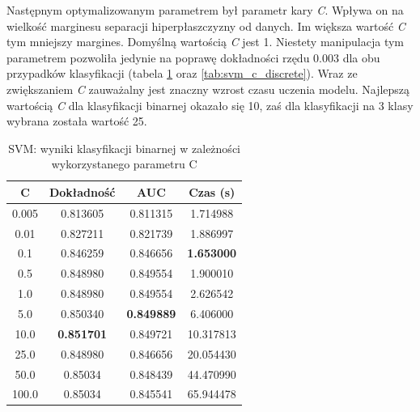 \documentclass[a4paper, twoside, 11pt, openright]{article}
\begin{document}
Następnym optymalizowanym parametrem był parametr kary \textit{C}. Wpływa on na wielkość marginesu separacji hiperpłaszczyzny od danych. Im większa wartość \textit{C} tym mniejszy margines. Domyślną wartością \textit{C} jest 1. Niestety manipulacja tym parametrem pozwoliła jedynie na poprawę dokładności rzędu $0.003$ dla obu przypadków klasyfikacji (tabela \ref{tab:svm_c_binary} oraz \ref{tab:svm_c_discrete}). Wraz ze zwiększaniem \textit{C} zauważalny jest znaczny wzrost czasu uczenia modelu. Najlepszą wartością \textit{C} dla klasyfikacji binarnej okazało się 10, zaś dla klasyfikacji na 3 klasy wybrana została wartość 25. 


\begin{table}[H]
    \centering
    \begin{tabular}{|c|c|c|c|}
    \hline
        \textbf{C} & \textbf{Dokładność} & \textbf{AUC} & \textbf{Czas (s)} \\ \hline
0.005 &  0.813605 &  0.811315 &    1.714988 \\ \hline
0.01  &  0.827211 &  0.821739 &    1.886997 \\ \hline
0.1   &  0.846259 &  0.846656 &    \textbf{1.653000} \\ \hline
0.5   &  0.848980 &  0.849554 &    1.900010 \\ \hline
1.0   &  0.848980 &  0.849554 &    2.626542 \\ \hline
5.0   &  0.850340 &  \textbf{0.849889} &    6.406000 \\ \hline
10.0  &  \textbf{0.851701} &  0.849721 &   10.317813 \\ \hline
25.0  &  0.848980 &  0.846656 &   20.054430 \\ \hline
50.0  &  0.85034 &  0.848439 &   44.470990 \\ \hline
100.0  &  0.85034 &  0.845541 &   65.944478 \\ \hline
    \end{tabular}
    \caption{SVM: wyniki klasyfikacji binarnej w zależności wykorzystanego parametru C}
    \label{tab:svm_c_binary}
\end{table}
\end{document}

